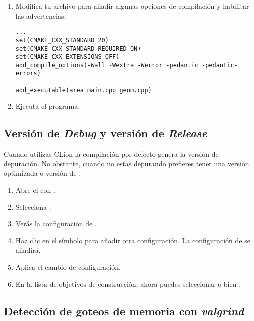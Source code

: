 \begin{enumerate}
\item
Modifica tu archivo  para añadir algunas opciones de compilación y 
habilitar las advertencias:

\begin{lstlisting}
...
set(CMAKE_CXX_STANDARD 20)
set(CMAKE_CXX_STANDARD_REQUIRED ON)
set(CMAKE_CXX_EXTENSIONS_OFF)
add_compile_options(-Wall -Wextra -Werror -pedantic -pedantic-errors)

add_executable(area main.cpp geom.cpp)
\end{lstlisting}

\item
Ejecuta el programa.

\end{enumerate}

\subsection{Versión de \emph{Debug} y versión de \emph{Release}}

Cuando utilizas CLion la compilación por defecto genera la versión de depuración.
No obstante, cuando no estas depurando prefieres tener una versión optimizada o versión de .

\begin{enumerate}

\item
Abre el  con .

\item
Selecciona .

\item 
Verás la configuración de .

\item 
Haz clic en el símbolo \textmark{+} 
para añadir otra configuración.
La configuración de  se añadirá.

\item
Aplica el cambio de configuración.

\item
En la lista de objetivos de construcción, ahora puedes seleccionar 
 o bien .

\end{enumerate}

\subsection{Detección de goteos de memoria con \emph{valgrind}}

